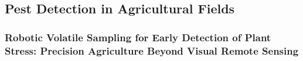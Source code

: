 \subsection{Pest Detection in Agricultural Fields}

\subsubsection{Robotic Volatile Sampling for Early Detection of Plant Stress: Precision Agriculture Beyond Visual Remote Sensing \cite{Geckeler2023a}}



